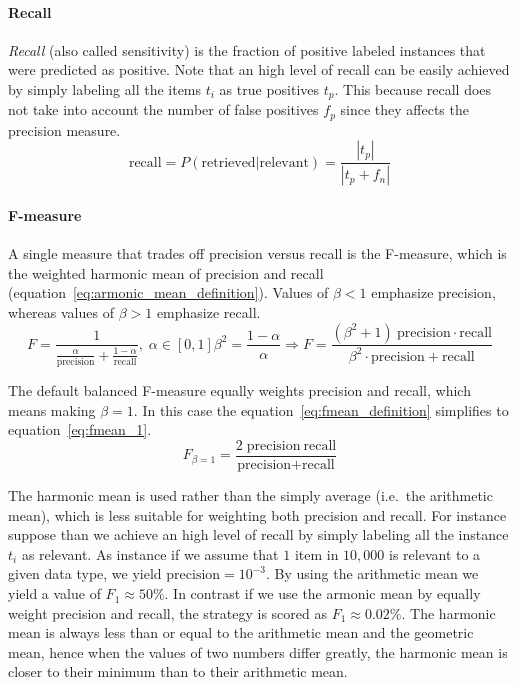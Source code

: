 \paragraph{Recall} \emph{Recall} (also called sensitivity) is the fraction of positive labeled instances that were predicted as positive.  Note that an high level of recall can be easily achieved by simply labeling all the items $t_i$ as true positives $t_p$. This because recall does not take into account the number of false positives $f_p$ since they affects the precision measure.
\begin{equation}
 \mbox{recall} = P(\mbox{retrieved|relevant}) = \frac{| t_p |}{| t_p+f_n |}
\end{equation}

\paragraph{F-measure} A single measure that trades off precision versus recall is the F-measure, which is the weighted harmonic mean of precision and recall (equation~\ref{eq:armonic_mean_definition}). Values of $\beta < 1$ emphasize precision, whereas values of $\beta > 1$ emphasize recall.
\begin{subequations}
  \begin{equation}
    F = \frac{1}{\frac{\alpha}{\mbox{precision}}+\frac{1-\alpha}{\mbox{recall}}}, \; \alpha \in [0,1]
  \label{eq:armonic_mean_definition}
  \end{equation}
  \begin{equation}
    \beta^2 =\frac{1-\alpha}{\alpha} \Rightarrow F = \dfrac{(\beta^2+1) \: \mbox{precision} \cdot \mbox{recall}}{\beta^2 \cdot \mbox{precision} + \mbox{recall}}
  \label{eq:fmean_definition}
  \end{equation}
\end{subequations}

The default balanced F-measure equally weights precision and recall, which means making $\beta=1$. In this case the equation~\ref{eq:fmean_definition} simplifies to equation~\ref{eq:fmean_1}.
\begin{equation}
    F_{\beta = 1} = \frac{2 \; \mbox{precision} \: \mbox{recall}}{\mbox{precision} + \mbox{recall}}
  \label{eq:fmean_1}
\end{equation}

The harmonic mean is used rather than the simply average (i.e.\ the arithmetic mean), which is less suitable for weighting both precision and recall. For instance suppose than we achieve an high level of recall by simply labeling all the instance $t_i$ as relevant. As instance if we assume that $1$ item in $10,000$ is relevant to a given data type, we yield $\mbox{precision} = 10^{-3}$. By using the arithmetic mean we yield a value of $F_1\approx50\%$. In contrast if we use the armonic mean by equally weight precision and recall, the strategy is scored as $F_1\approx0.02\%$. The harmonic mean is always less than or equal to the arithmetic mean and the geometric mean, hence when the values of two numbers differ greatly, the harmonic mean is closer to their minimum than to their arithmetic mean.

